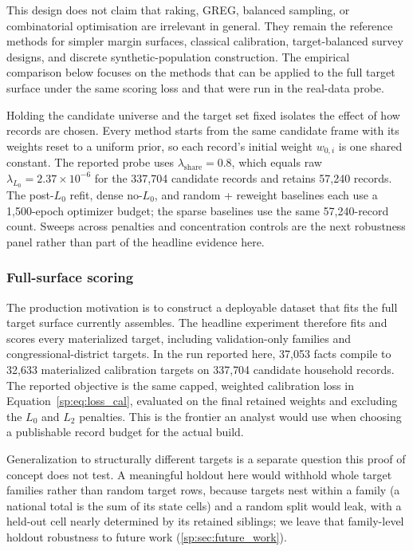 This design does not claim that raking, GREG, balanced sampling, or combinatorial optimisation are
irrelevant in general. They remain the reference methods for simpler margin surfaces, classical
calibration, target-balanced survey designs, and discrete synthetic-population construction. The
empirical comparison below focuses on the methods that can be applied to the full \populace{} target
surface under the same scoring loss and that were run in the real-data probe.

Holding the candidate universe and the target set fixed isolates the effect of how records are
chosen. Every method starts from the same candidate frame with its weights reset to a uniform prior, so
each record's initial weight $w_{0,i}$ is one shared constant. The reported probe uses
$\lambda_{\mathrm{share}}=0.8$, which equals raw $\lambda_{L_0}=2.37\times10^{-6}$ for the 337{,}704
candidate records and retains 57{,}240 records. The post-$L_0$ refit, dense no-$L_0$, and random +
reweight baselines each use a 1{,}500-epoch optimizer budget; the sparse baselines use the same
57{,}240-record count. Sweeps across penalties and concentration controls are the next
robustness panel rather than part of the headline evidence here.

\subsubsection{Full-surface scoring}
\label{sp:sec:oos}

The production motivation is to construct a deployable dataset that fits the full target surface 
\populace{} currently assembles. The headline experiment therefore fits and scores every materialized 
target, including validation-only families and congressional-district targets. In the run reported here, 
37{,}053 \chronicle{} facts compile to 32{,}633 materialized calibration targets on 337{,}704 candidate
household records. The reported objective is the same capped, weighted calibration loss in 
Equation~\ref{sp:eq:loss_cal}, evaluated on the final retained weights and excluding the $L_0$ and $L_2$ 
penalties. This is the frontier an analyst would use when choosing a publishable record budget for 
the actual \populace{} build.

Generalization to structurally different targets is a separate question this proof of concept does not
test. A meaningful holdout here would withhold whole target families rather than random target rows,
because targets nest within a family (a national total is the sum of its state cells) and a random split
would leak, with a held-out cell nearly determined by its retained siblings; we leave that family-level
holdout robustness to future work (\autoref{sp:sec:future_work}).

